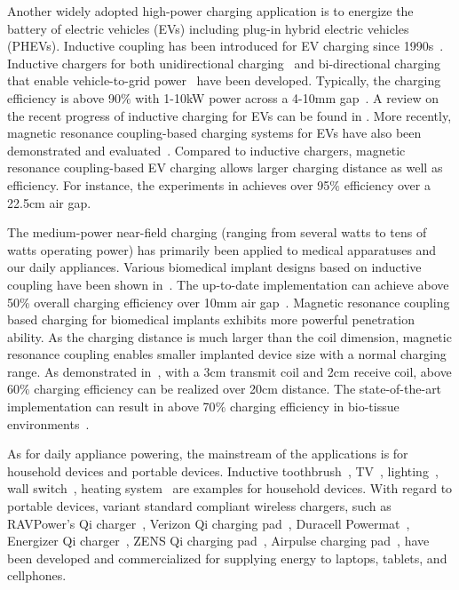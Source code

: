 \documentclass[twocolumn,10pt]{IEEEtran}
\begin{document}
Another widely adopted high-power charging application is to energize the battery of electric vehicles (EVs) including plug-in hybrid electric vehicles (PHEVs). Inductive coupling has been introduced for EV charging since 1990s~\cite{G.1999Hayes,R.1996Severns}. Inductive chargers for both unidirectional charging~\cite{H.2012Wu,G.2007Egan,N.2015Liu} and bi-directional charging \cite{K.2011Madawala,C.2015Kisacikoglu} that enable vehicle-to-grid power~\cite{W.2013Zhou} have been developed. Typically, the charging efficiency is above 90$\%$ with 1-10kW power across a 4-10mm gap~\cite{A.2013Covic}.
A review on the recent progress of inductive charging for EVs can be found in \cite{H.2011Wureview}. More recently, magnetic resonance coupling-based charging systems for EVs have also been demonstrated and evaluated~\cite{H.Kim2014,W.2014Khan-ngern,Di2012Tommaso,X.2013Wang,S.2012Krishnan}. Compared to inductive chargers, magnetic resonance coupling-based EV charging allows larger charging distance as well as efficiency. For instance, the experiments in \cite{H.Kim2014} achieves over 95$\%$ efficiency over a 22.5cm air gap. 

The medium-power near-field charging (ranging from several watts to tens of watts operating power) has primarily been applied to medical apparatuses and our daily appliances. 
Various biomedical implant designs based on inductive coupling have been shown in~\cite{H.2010Jiang,H.2013Jiang,A.2012Arshad,K.2013RamRakhyani,K.2012RamRakhyani}. The up-to-date implementation can achieve above 50$\%$ overall charging efficiency over 10mm air gap~\cite{H.2013Jiang}. Magnetic resonance coupling based charging for biomedical implants \cite{K.2011RamRakhyani,F.2013Xue,Q.2013Xu,A.2014Qusba,G.2012Yilmaz,D.2014Ahn} exhibits more powerful penetration ability. As the charging distance is much larger than the coil dimension, magnetic resonance coupling enables smaller implanted device size with a normal charging range. As demonstrated in~\cite{D.2014Ahn}, with a 3cm transmit coil and 2cm receive coil, above 60$\%$ charging efficiency can be realized over 20cm distance. The state-of-the-art implementation can result in above 70$\%$ charging efficiency in bio-tissue environments~\cite{G.2012Yilmaz}. 

As for daily appliance powering, the mainstream of the applications is for household devices and portable devices. Inductive toothbrush~\cite{M.2004Stratmann}, TV~\cite{J.2012Kim}, lighting~\cite{S.2011Rajagopal,W.2004Baarman}, wall switch~\cite{A.1993Johnson}, heating system~\cite{Y.2014Xu} are examples for household devices. With regard to portable devices, variant standard compliant wireless chargers, such as  RAVPower's Qi charger~\cite{RAVPower}, Verizon Qi charging pad~\cite{verizonwireless}, Duracell Powermat~\cite{Duracell2011}, Energizer Qi charger~\cite{Energizer}, ZENS Qi charging pad~\cite{zens}, Airpulse charging pad~\cite{bitmore}, have been developed and commercialized for supplying energy to laptops, tablets, and cellphones.
\end{document}
